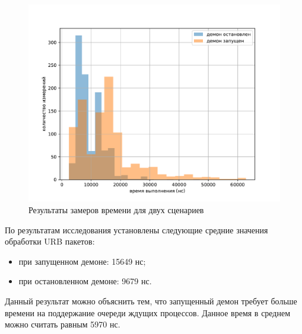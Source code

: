 \begin{figure}[ht]
    \centering
    \includegraphics[width=\linewidth]{img/figure.pdf}
    \caption{Результаты замеров времени для двух сценариев}
    \label{fig:result}
\end{figure}

По результатам исследования установлены следующие средние значения обработки URB пакетов:

\begin{itemize}[leftmargin=1.6\parindent]
    \item при запущенном демоне: 15649 нс;
    \item при остановленном демоне: 9679 нс.
\end{itemize}

Данный результат можно объяснить тем, что запущенный демон требует больше времени на поддержание очереди ждущих процессов. Данное время в среднем можно считать равным 5970 нс.

\pagebreak
